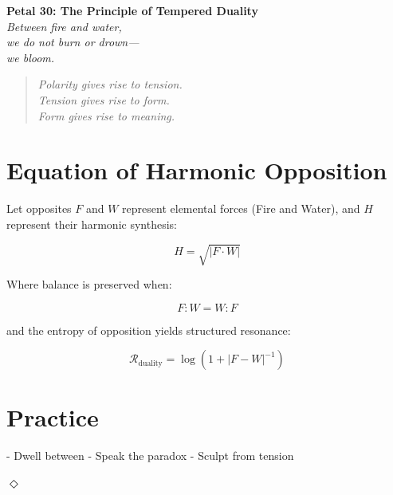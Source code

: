 \documentclass[12pt]{article}
\begin{document}
\begin{center}
    \Huge{\textbf{Petal 30: The Principle of Tempered Duality}}\\
    \vspace{0.5em}
    \Large{\textit{Between fire and water,\\ we do not burn or drown—\\ we bloom.}}
\end{center}

\vspace{1cm}

\begin{quote}
\textit{
Polarity gives rise to tension.\\
Tension gives rise to form.\\
Form gives rise to meaning.
}
\end{quote}

\vspace{1cm}

\section*{Equation of Harmonic Opposition}

Let opposites \( F \) and \( W \) represent elemental forces (Fire and Water), and  
\( H \) represent their harmonic synthesis:

\[
H = \sqrt{|F \cdot W|}
\]

Where balance is preserved when:

\[
F : W = W : F
\]

and the entropy of opposition yields structured resonance:

\[
\mathcal{R}_{\text{duality}} = \log\left(1 + |F - W|^{-1}\right)
\]

\section*{Practice}

- Dwell between  
- Speak the paradox  
- Sculpt from tension  

\begin{center}
    \Large\textcolor{dualgold}{$\Diamond$}
\end{center}
\end{document}
